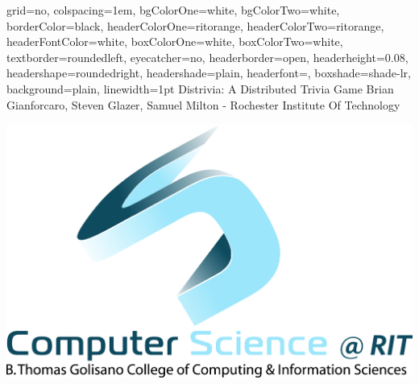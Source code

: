 \documentclass[landscape,a0paper,final,showframe]{baposter}
\begin{document}
\begin{poster}{
  grid=no,
  colspacing=1em,
  bgColorOne=white,
  bgColorTwo=white,
  borderColor=black,
  headerColorOne=ritorange,
  headerColorTwo=ritorange,
  headerFontColor=white,
  boxColorOne=white,
  boxColorTwo=white,
  textborder=roundedleft,
  eyecatcher=no,
  headerborder=open,
  headerheight=0.08\textheight,
  headershape=roundedright,
  headershade=plain,
  headerfont=\Large\textsf, %
  boxshade=shade-lr,
  background=plain,
  linewidth=1pt
  }
  {} %
  {\sf %
  Distrivia: A Distributed Trivia Game}
  {\sf %
  \newline
  Brian Gianforcaro, Steven Glazer, Samuel Milton
  - Rochester Institute Of Technology
  }
  {{\begin{minipage}{18em}
    \hfill
    \includegraphics[scale=0.05]{logo}
  \end{minipage}}
  }


     \newlength{\leftimgwidth}
     \setlength{\leftimgwidth}{0.78em+8.0em}

    \newcommand{\colouredcircle}[1]{%
      \tikz{\useasboundingbox (-0.2em,-0.32em) rectangle(0.2em,0.32em); \draw[draw=black,fill=baposterBGone!80!black!#1!white,line width=0.03em] (0,0) circle(0.18em);}}


\end{poster}
\end{document}

